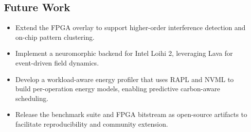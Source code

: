 \subsection{Future Work}

\begin{itemize}
    \item Extend the FPGA overlay to support higher-order interference detection and on-chip pattern clustering.
    \item Implement a neuromorphic backend for Intel Loihi 2, leveraging Lava for event-driven field dynamics.
    \item Develop a workload-aware energy profiler that uses RAPL and NVML to build per-operation energy models, enabling predictive carbon-aware scheduling.
    \item Release the benchmark suite and FPGA bitstream as open-source artifacts to facilitate reproducibility and community extension.
\end{itemize}